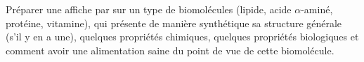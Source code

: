 \begin{programmeSeance}[2]
\end{programmeSeance}


\begin{tacheFinale}
  Préparer une affiche par  sur un type de biomolécules (lipide, acide $\alpha$-aminé, protéine, vitamine), qui présente de manière synthétique sa structure générale (s'il y en a une), quelques propriétés chimiques, quelques propriétés biologiques et comment avoir une alimentation saine du point de vue de cette biomolécule.
\end{tacheFinale}


